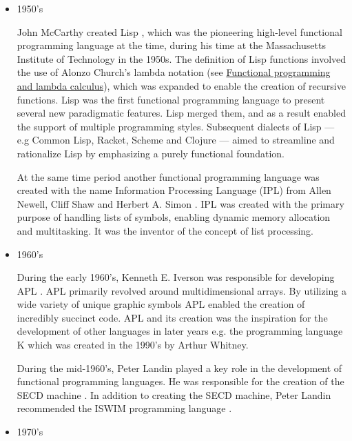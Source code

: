 \documentclass[a4paper, titlepage, twoside]{article}
\begin{document}
\begin{itemize}
\item 1950's

John McCarthy created Lisp \autocite{mccarthyRecursiveFunctionsSymbolic1960}, which was the pioneering high-level functional programming language at the time, during his time at the Massachusetts Institute of Technology in the 1950s. The definition of Lisp functions involved the use of Alonzo Church's lambda notation (see \hyperref[sec:org1feda20]{Functional programming and lambda calculus}), which was expanded to enable the creation of recursive functions. Lisp was the first functional programming language to present several new paradigmatic features. Lisp merged them, and as a result enabled the support of multiple programming styles. Subsequent dialects of Lisp --- e.g Common Lisp, Racket, Scheme and Clojure \autocite{steeleCOMMONLISPLanguage1984,felleisenRacketManifesto2015,abelsonRevisedReportAlgorithmic1998,hickeyHistoryClojure2020} --- aimed to streamline and rationalize Lisp by emphasizing a purely functional foundation.

At the same time period another functional programming language was created with the name Information Processing Language (IPL) from Allen Newell, Cliff Shaw and Herbert A. Simon \autocite{newellIntroductionInformationProcessing1960}. IPL was created with the primary purpose of handling lists of symbols, enabling dynamic memory allocation and multitasking. It was the inventor of the concept of list processing.

\item 1960's

During the early 1960's, Kenneth E. Iverson was responsible for developing APL \autocite{iversonProgrammingLanguage1962}. APL primarily revolved around multidimensional arrays. By utilizing a wide variety of unique graphic symbols APL enabled the creation of incredibly succinct code. APL and its creation was the inspiration for the development of other languages in later years e.g. the programming language K which was created in the 1990's by Arthur Whitney.

During the mid-1960's, Peter Landin played a key role in the development of functional programming languages. He was responsible for the creation of the SECD machine \autocite{landinMechanicalEvaluationExpressions1964}. In addition to creating the SECD machine, Peter Landin recommended the ISWIM programming language \autocite{landinNext700Programming1966}.

\item 1970's


\end{itemize}
\end{document}
